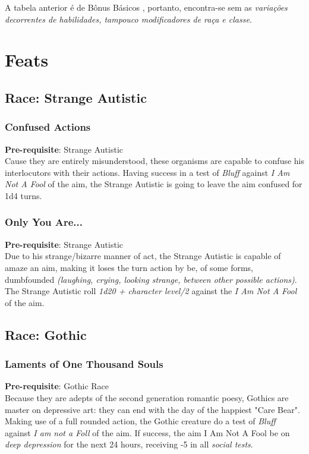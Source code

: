 \documentclass[ letterpaper,12pt]{article}
\begin{document}
A tabela anterior é de Bônus Básicos , portanto, encontra-se sem as {\it variações decorrentes de habilidades, tampouco modificadores de raça e classe}.\\

\section{Feats}

\subsection{Race: Strange Autistic}

\subsubsection{Confused Actions}
{\bf Pre-requisite}: Strange Autistic\\
Cause they are entirely misunderstood, these organisms are capable to confuse his interlocutors with their actions. Having success in a test of {\it Bluff} against {\it I Am Not A Fool} of the aim, the Strange Autistic is going to leave the aim confused for 1d4 turns.

\subsubsection{Only You Are...}
 {\bf Pre-requisite}: Strange Autistic\\
Due to his strange/bizarre manner of act, the Strange Autistic is capable of amaze an aim, making it loses the turn action by be, of some forms, dumbfounded {\it (laughing, crying, looking strange, between other possible actions)}.  The Strange Autistic roll {\it 1d20 + character level/2} against the {\it I Am Not A Fool} of the aim.

\subsection{Race: Gothic}

\subsubsection{Laments of One Thousand Souls}
{\bf Pre-requisite}: Gothic Race\\
Because they are adepts of the second generation romantic poesy, Gothics are master on depressive art: they can end with the day of the happiest "Care Bear". Making use of a full rounded action, the Gothic creature do a test of {\it Bluff} against {\it I am not a Foll} of the aim. If success, the aim I Am Not A Fool be on {\it deep depression} for the next 24 hours, receiving -5 in all {\it social tests}.
\end{document}
